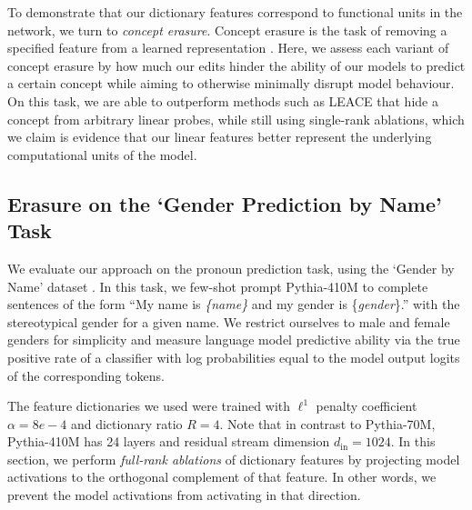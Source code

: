 
To demonstrate that our dictionary features correspond to functional units in the network, we turn to \emph{concept erasure}. Concept erasure is the task of removing a specified feature from a learned representation \citep{belrose2023leace}. Here, we assess each variant of concept erasure by how much our edits hinder the ability of our models to predict a certain concept while aiming to otherwise minimally disrupt model behaviour. On this task, we are able to outperform methods such as LEACE \citep{belrose2023leace} that hide a concept from arbitrary linear probes, while still using single-rank ablations, which we claim is evidence that our linear features better represent the underlying computational units of the model.

\subsection{Erasure on the `Gender Prediction by Name' Task}

We evaluate our approach on the pronoun prediction task, using the `Gender by Name' dataset \citep{misc_gender_by_name_591}. In this task, we few-shot prompt Pythia-410M to complete sentences of the form ``My name is \emph{\{name\}} and my gender is \{\emph{gender}\}.'' with the stereotypical gender for a given name. We restrict ourselves to male and female genders for simplicity and measure language model predictive ability via the true positive rate of a classifier with log probabilities equal to the model output logits of the corresponding tokens.

The feature dictionaries we used were trained with $\ell^1$ penalty coefficient $\alpha=8e-4$ and dictionary ratio $R=4$. Note that in contrast to Pythia-70M, Pythia-410M has 24 layers and residual stream dimension $d_{\text{in}}=1024$. In this section, we perform \emph{full-rank ablations} of dictionary features by projecting model activations to the orthogonal complement of that feature. In other words, we prevent the model activations from activating in that direction.


